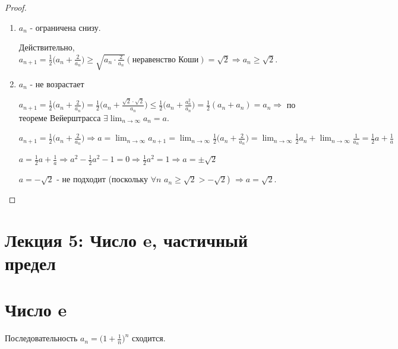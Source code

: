 	\begin{proof}
		\begin{enumerate}
			\item $a_n$ - ограничена снизу.
			
			Действительно, $a_{n + 1} = \frac{1}{2}\big(a_n + \frac{2}{a_n}\big) \geqslant \sqrt{a_n \cdot \frac{2}{a_n}} (\text{неравенство Коши}) = \sqrt{2} \Rightarrow a_n \geqslant \sqrt{2}.$
			
			\item $a_n$ - не возрастает
			
			$a_{n + 1} = \frac{1}{2}\big(a_n + \frac{2}{a_n}\big) = \frac{1}{2}\big(a_n + \frac{\sqrt{2} \cdot \sqrt{2}}{a_n}\big) \leqslant \frac{1}{2}\big(a_n + \frac{a_n^2}{a_n}\big) = \frac{1}{2}(a_n + a_n) = a_n \Rightarrow$ по теореме Вейерштрасса $\exists \lim_{n \to \infty} a_n = a.$
			
			$a_{n + 1} = \frac{1}{2}\big(a_n + \frac{2}{a_n}\big) \Rightarrow a = \lim_{n \to \infty} a_{n + 1} = \lim_{n \to \infty} \frac{1}{2}\big(a_n + \frac{2}{a_n}\big) = \lim_{n \to \infty} \frac{1}{2}a_n + \lim_{n \to \infty} \frac{1}{a_n} = \frac{1}{2}a + \frac{1}{a}$
			
			$a = \frac{1}{2}a + \frac{1}{a} \Rightarrow a^2 - \frac{1}{2}a^2 - 1 = 0 \Rightarrow \frac{1}{2}a^2 = 1 \Rightarrow a = \pm \sqrt{2}$
			
			$a = -\sqrt{2}$ - не подходит (поскольку $\forall n$ $a_n \geqslant \sqrt{2} > -\sqrt{2}$) $\Rightarrow a = \sqrt{2}.$
			
		\end{enumerate}
	\end{proof}
	
	\newpage
	
	\section*{Лекция 5: Число e, частичный предел}
	
	\section{Число e}
	
	\begin{sentence}
		Последовательность $a_n = \big(1 + \frac{1}{n}\big)^n$ сходится.
	\end{sentence}
	
